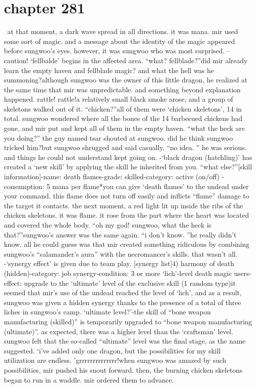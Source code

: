 \section{chapter 281}






 at that moment, a dark wave spread in all directions.
 it was mana.
 mir used some sort of magic.
and a message about the identity of the magic appeared before sungwoo’s eyes.
however, it was sungwoo who was most surprised.
– caution! ‘fellbalde’ begins in the affected area.
“what? fellblade?”did mir already learn the empty haven and fellblade magic? and what the hell was he summoning?although sungwoo was the owner of this little dragon, he realized at the same time that mir was unpredictable.
and something beyond explanation happened.
rattle! rattle!a relatively small black smoke arose, and a group of skeletons walked out of it.
“chicken?”all of them were ‘chicken skeletons’, 14 in total.
 sungwoo wondered where all the bones of the 14 barbecued chickens had gone, and mir put and kept all of them in the empty haven.
“what the heck are you doing?” the guy named tsar shouted at sungwoo.
 did he think sungwoo tricked him?but sungwoo shrugged and said casually, “no idea.
” he was serious.
and things he could not understand kept going on.
-‘black dragon (hatchling)’ has created a ‘new skill’ by applying the skill he inherited from you.
“what else?”[skill information]-name: death flames-grade: skilled-category: active (on/off)
-consumption: 5 mana per flame*you can give ‘death flames’ to the undead under your command.
 this flame does not turn off easily and inflicts “flame” damage to the target it contacts.
the next moment, a red light lit up inside the ribs of the chicken skeletons.
it was flame.
 it rose from the part where the heart was located and covered the whole body.
“oh my god! sungwoo, what the heck is that?”sungwoo’s answer was the same again.
 “i don’t know.
”he really didn’t know.
 all he could guess was that mir created something ridiculous by combining sungwoo’s “salamander’s aura” with the necromancer’s skills.
that wasn’t all.
-‘synergy effect’ is given due to team play.
[synergy list]4) harmony of death (hidden)-category: job synergy-condition: 3 or more ‘lich’-level death magic users-effect: upgrade to the ‘ultimate’ level of the exclusive skill (1 random type)it seemed that mir’s use of the undead reached the level of ‘lich’, and as a result, sungwoo was given a hidden synergy thanks to the presence of a total of three liches in sungwoo’s camp.
‘ultimate level?’-the skill of “bone weapon manufacturing (skilled)” is temporarily upgraded to “bone weapon manufacturing (ultimate)”.
as expected, there was a higher level than the ‘craftsman’ level.
 sungwoo felt that the so-called “ultimate” level was the final stage, as the name suggested.
‘i’ve added only one dragon, but the possibilities for my skill utilization are endless.
’grrrrrrrrrrrrrr!when sungwoo was amazed by such possibilities, mir pushed his snout forward.
then, the burning chicken skeletons began to run in a waddle.
 mir ordered them to advance.

